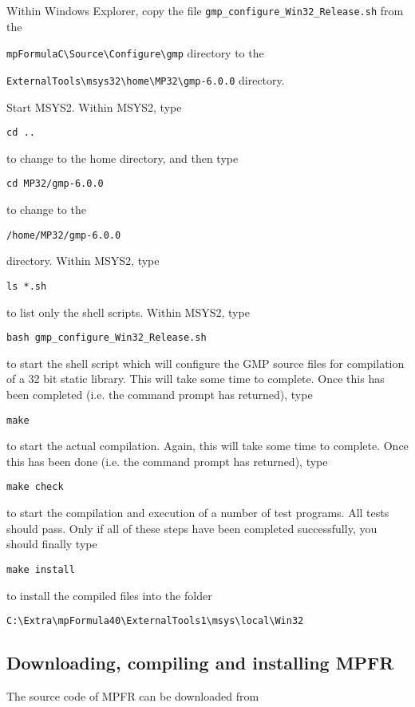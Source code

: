 \vpara
Within Windows Explorer, copy the file \verb|gmp_configure_Win32_Release.sh|  from the

\verb|mpFormulaC\Source\Configure\gmp| directory to the 
 
\verb|ExternalTools\msys32\home\MP32\gmp-6.0.0| directory.  


\vpara
Start MSYS2. Within MSYS2, type
\begin{verbatim}
cd ..
\end{verbatim}
to change to the home directory, and then type 
\begin{verbatim}
cd MP32/gmp-6.0.0
\end{verbatim}
to change to the
\begin{verbatim}
/home/MP32/gmp-6.0.0
\end{verbatim}
directory. Within MSYS2, type
\begin{verbatim}
ls *.sh
\end{verbatim}
to list only the shell scripts. Within MSYS2, type
\begin{verbatim}
bash gmp_configure_Win32_Release.sh
\end{verbatim}
to start the shell script which will configure the GMP source files for compilation of a 32 bit static library. This will take some time to complete. Once this has been completed (i.e. the command prompt has returned), type
\begin{verbatim}
make
\end{verbatim}
to start the actual compilation. Again, this will take some time to complete. Once this has been done (i.e. the command prompt has returned), type
\begin{verbatim}
make check
\end{verbatim}
to start the compilation and execution of a number of test programs. All tests should pass. Only if all of these steps have been completed successfully, you should finally type
\begin{verbatim}
make install
\end{verbatim}
to install the compiled files into the folder
\begin{verbatim}
C:\Extra\mpFormula40\ExternalTools1\msys\local\Win32
\end{verbatim}



\newpage
\subsection{Downloading, compiling and installing MPFR}
The source code of MPFR can be downloaded from

